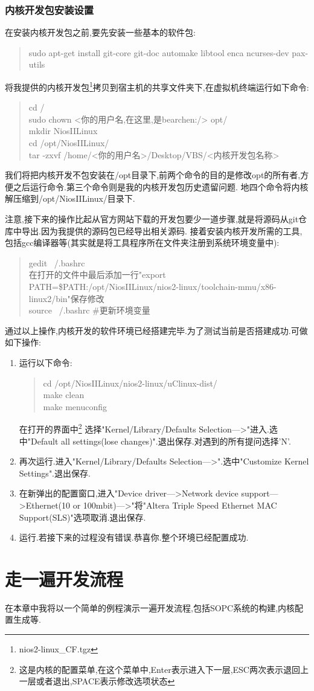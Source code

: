 \documentclass[12pt,a4paper]{article}
\begin{document}
\subsubsection{内核开发包安装设置}
在安装内核开发包之前,要先安装一些基本的软件包:
\begin{verse}
sudo apt-get install git-core git-doc automake libtool enca ncurses-dev pax-utils
\end{verse}

将我提供的内核开发包\footnote{nios2-linux\_CF.tgz}拷贝到{宿主机}的共享文件夹下,在{虚拟机终端}运行如下命令:
\begin{verse}
cd /\\sudo chown <你的用户名,在这里,是bearchen:/> opt/\\mkdir NiosIILinux\\cd /opt/NiosIILinux/\\
tar -zxvf /home/<你的用户名>/Desktop/VBS/<内核开发包名称>
\end{verse}
我们将把内核开发不包安装在/opt目录下,前两个命令的目的是修改opt的所有者,方便之后运行命令.第三个命令则是我的内核开发包历史遗留问题.
地四个命令将内核解压缩到/opt/NiosIILinux/目录下.

{注意,接下来的操作比起从官方网站下载的开发包要少一道步骤,就是将源码从git仓库中导出.因为我提供的源码包已经导出相关源码.}
接着安装内核开发所需的工具,包括gcc编译器等(其实就是将工具程序所在文件夹注册到系统环境变量中):
\begin{verse}
gedit ~/.bashrc\\在打开的文件中最后添加一行"export PATH=\$PATH:/opt/NiosIILinux/nios2-linux/toolchain-mmu/x86-linux2/bin"保存修改\\
source ~/.bashrc \#更新环境变量
\end{verse}
通过以上操作,内核开发的软件环境已经搭建完毕.为了测试当前是否搭建成功.可做如下操作:
\begin{enumerate}
\item 运行以下命令:
\begin{verse}
cd /opt/NiosIILinux/nios2-linux/uClinux-dist/\\make clean\\make menuconfig
\end{verse}
在打开的界面中\footnote{这是内核的配置菜单,在这个菜单中,Enter表示进入下一层,ESC两次表示退回上一层或者退出,SPACE表示修改选项状态}
选择"Kernel/Library/Defaults Selection--->"进入.选中"Default all settings(lose changes)".退出保存.对遇到的所有提问选择'N'.
\item 再次运行.进入"Kernel/Library/Defaults Selection--->".选中"Customize Kernel Settings".退出保存.
\item 在新弹出的配置窗口,进入"Device driver--->Network device support--->Ethernet(10 or 100mbit)--->"将"Altera Triple Speed Ethernet 
MAC Support(SLS)"选项取消.退出保存.
\item 运行.若接下来的过程没有错误.恭喜你.整个环境已经配置成功.
\end{enumerate}
\newpage{}
\section{走一遍开发流程}
在本章中我将以一个简单的例程演示一遍开发流程,包括SOPC系统的构建,内核配置生成等.
\end{document}
